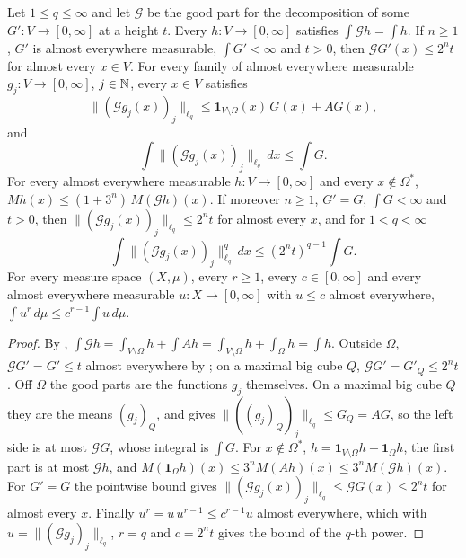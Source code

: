 \begin{lemma}
\label{lem:calderon-zygmund-good-parts}
\leanok
{}
Let $1 \leq q \leq \infty$ and let $\mathcal G$ be the good part for the decomposition of some
$G' : V \to [0, \infty]$ at a height $t$. Every $h : V \to [0, \infty]$ satisfies
$\int \mathcal G h = \int h$. If $n \geq 1$, $G'$ is almost everywhere measurable,
$\int G' < \infty$ and $t > 0$, then $\mathcal G G'(x) \leq 2^n t$ for almost every $x \in V$.
For every family of almost everywhere measurable
$g_j : V \to [0, \infty]$, $j \in \mathbb{N}$, every $x \in V$ satisfies
\[
  \|(\mathcal G g_j(x))_j\|_{\ell_q} \leq \mathbf 1_{V \setminus \Omega}(x) \, G(x) + A G(x),
\]
and
\[
  \int \|(\mathcal G g_j(x))_j\|_{\ell_q} \, dx \leq \int G .
\]
For every almost everywhere measurable $h : V \to [0, \infty]$ and every
$x \notin \Omega^*$, $M h(x) \leq (1 + 3^n) \, M(\mathcal G h)(x)$. If moreover $n \geq 1$,
$G' = G$, $\int G < \infty$ and $t > 0$, then $\|(\mathcal G g_j(x))_j\|_{\ell_q} \leq 2^n t$
for almost every $x$, and for $1 < q < \infty$
\[
  \int \|(\mathcal G g_j(x))_j\|_{\ell_q}^q \, dx \leq (2^n t)^{q-1} \int G .
\]
For every measure space $(X, \mu)$, every $r \geq 1$, every $c \in [0, \infty]$ and every
almost everywhere measurable $u : X \to [0, \infty]$ with $u \leq c$ almost everywhere,
$\int u^r \, d\mu \leq c^{r-1} \int u \, d\mu$.
\end{lemma}

\begin{proof}
\leanok
By ,
$\int \mathcal G h = \int_{V \setminus \Omega} h + \int A h = \int_{V \setminus \Omega} h
+ \int_\Omega h = \int h$. Outside $\Omega$, $\mathcal G G' = G' \leq t$ almost everywhere by
; on a maximal big cube $Q$, $\mathcal G G' = G'_Q \leq 2^n t$.
Off $\Omega$ the good parts are the functions $g_j$ themselves. On a maximal big cube $Q$ they
are the means $(g_j)_Q$, and  gives
$\|((g_j)_Q)_j\|_{\ell_q} \leq G_Q = A G$, so the left side is at most $\mathcal G G$, whose
integral is $\int G$. For $x \notin \Omega^*$,
$h = \mathbf 1_{V \setminus \Omega} h + \mathbf 1_\Omega h$, the first part is at most
$\mathcal G h$, and $M(\mathbf 1_\Omega h)(x) \leq 3^n M(A h)(x) \leq 3^n M(\mathcal G h)(x)$.
For $G' = G$ the pointwise bound gives $\|(\mathcal G g_j(x))_j\|_{\ell_q} \leq \mathcal G G(x)
\leq 2^n t$ for almost every $x$. Finally $u^r = u \, u^{r-1} \leq c^{r-1} u$ almost everywhere,
which with $u = \|(\mathcal G g_j)_j\|_{\ell_q}$, $r = q$ and $c = 2^n t$ gives the bound of the
$q$-th power.
\end{proof}

